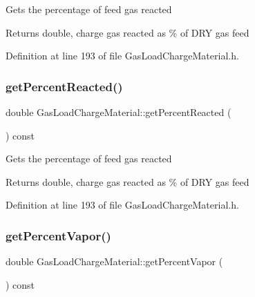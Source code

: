 Gets the percentage of feed gas reacted

\begin{DoxyReturn}{Returns}
double, charge gas reacted as \% of D\+RY gas feed 
\end{DoxyReturn}


Definition at line 193 of file Gas\+Load\+Charge\+Material.\+h.

\mbox{\label{class_gas_load_charge_material_af47b4c6c3e547325cadd81cbb09937ee}} 
\subsubsection{\texorpdfstring{get\+Percent\+Reacted()}{getPercentReacted()}\hspace{0.1cm}{\footnotesize\ttfamily [3/3]}}
{\footnotesize\ttfamily double Gas\+Load\+Charge\+Material\+::get\+Percent\+Reacted (\begin{DoxyParamCaption}{ }\end{DoxyParamCaption}) const\hspace{0.3cm}{\ttfamily [inline]}}

Gets the percentage of feed gas reacted

\begin{DoxyReturn}{Returns}
double, charge gas reacted as \% of D\+RY gas feed 
\end{DoxyReturn}


Definition at line 193 of file Gas\+Load\+Charge\+Material.\+h.

\mbox{\label{class_gas_load_charge_material_a19b8ecfad235b5824b0a88903cff667a}} 
\subsubsection{\texorpdfstring{get\+Percent\+Vapor()}{getPercentVapor()}\hspace{0.1cm}{\footnotesize\ttfamily [1/3]}}
{\footnotesize\ttfamily double Gas\+Load\+Charge\+Material\+::get\+Percent\+Vapor (\begin{DoxyParamCaption}{ }\end{DoxyParamCaption}) const\hspace{0.3cm}{\ttfamily [inline]}}

